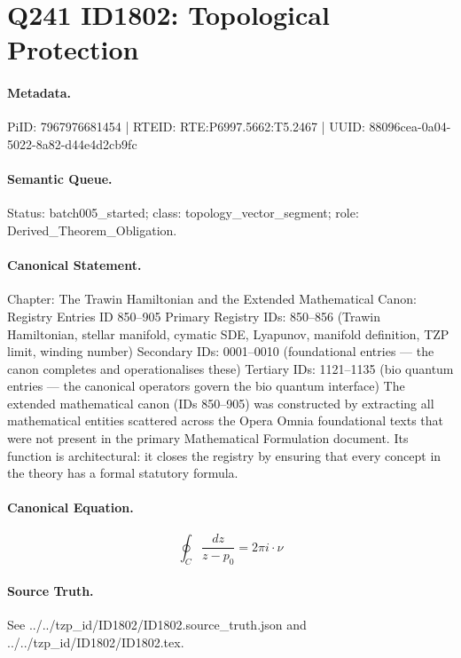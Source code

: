 \section*{Q241 ID1802: Topological Protection}
\paragraph{Metadata.}
PiID: 7967976681454 | RTEID: RTE:P6997.5662:T5.2467 | UUID: 88096cea-0a04-5022-8a82-d44e4d2cb9fc

\paragraph{Semantic Queue.}
Status: batch005\_started; class: topology\_vector\_segment; role: Derived\_Theorem\_Obligation.

\paragraph{Canonical Statement.}
Chapter: The Trawin Hamiltonian and the Extended Mathematical Canon: Registry Entries ID 850–905 Primary Registry IDs: 850–856 (Trawin Hamiltonian, stellar manifold, cymatic SDE, Lyapunov, manifold definition, TZP limit, winding number) Secondary IDs: 0001–0010 (foundational entries — the canon completes and operationalises these) Tertiary IDs: 1121–1135 (bio quantum entries — the canonical operators govern the bio quantum interface) The extended mathematical canon (IDs 850–905) was constructed by extracting all mathematical entities scattered across the Opera Omnia foundational texts that were not present in the primary Mathematical Formulation document. Its function is architectural: it closes the registry by ensuring that every concept in the theory has a formal statutory formula.

\paragraph{Canonical Equation.}
\[
\oint_C \frac{dz}{z - p_0} = 2\pi i \cdot \nu
\]

\paragraph{Source Truth.}
See ../../tzp\_id/ID1802/ID1802.source\_truth.json and ../../tzp\_id/ID1802/ID1802.tex.

